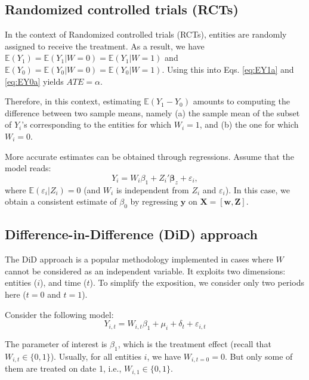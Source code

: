 \documentclass[
  12pt,
]{book}
\theoremstyle{definition}
\theoremstyle{definition}
\theoremstyle{definition}
\theoremstyle{definition}
\theoremstyle{remark}
\begin{document}
\hypertarget{randomized-controlled-trials-rcts}{%
\subsection{Randomized controlled trials (RCTs)}\label{randomized-controlled-trials-rcts}}

In the context of Randomized controlled trials (RCTs), entities are randomly assigned to receive the treatment. As a result, we have \(\mathbb{E}(Y_1) = \mathbb{E}(Y_1|W=0) = \mathbb{E}(Y_1|W=1)\) and \(\mathbb{E}(Y_0) = \mathbb{E}(Y_0|W=0) = \mathbb{E}(Y_0|W=1)\). Using this into Eqs. \eqref{eq:EY1a} and \eqref{eq:EY0a} yields \(ATE = \alpha\).

Therefore, in this context, estimating \(\mathbb{E}(Y_1-Y_0)\) amounts to computing the difference between two sample means, namely (a) the sample mean of the subset of \(Y_i\)'s corresponding to the entities for which \(W_i=1\), and (b) the one for which \(W_i=0\).

More accurate estimates can be obtained through regressions. Assume that the model reads:
\[
Y_{i} = W_{i} \beta_{1} + Z_i'\boldsymbol\beta_z + \varepsilon_i,
\]
where \(\mathbb{E}(\varepsilon_i|Z_i) = 0\) (and \(W_i\) is independent from \(Z_i\) and \(\varepsilon_i\)). In this case, we obtain a consistent estimate of \(\beta_0\) by regressing \(\mathbf{y}\) on \(\mathbf{X} = [\mathbf{w},\mathbf{Z}]\).

\hypertarget{difference-in-difference-did-approach}{%
\subsection{Difference-in-Difference (DiD) approach}\label{difference-in-difference-did-approach}}

The DiD approach is a popular methodology implemented in cases where \(W\) cannot be considered as an independent variable. It exploits two dimensions: entities (\(i\)), and time (\(t\)). To simplify the exposition, we consider only two periods here (\(t=0\) and \(t=1\)).

Consider the following model:
\begin{equation}
Y_{i,t} = W_{i,t} \beta_1 + \mu_i + \delta_t + \varepsilon_{i,t}\label{eq:DiD}
\end{equation}

The parameter of interest is \(\beta_{1}\), which is the treatment effect (recall that \(W_{i,t} \in \{0,1\}\)). Usually, for all entities \(i\), we have \(W_{i,t=0}=0\). But only some of them are treated on date 1, i.e., \(W_{i,1} \in \{0,1\}\).
\end{document}
